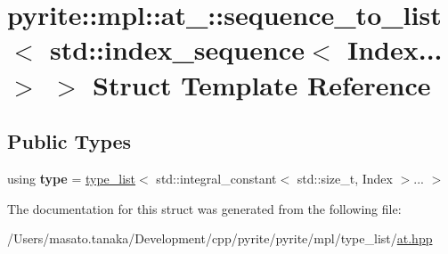 \hypertarget{structpyrite_1_1mpl_1_1at___1_1sequence__to__list_3_01std_1_1index__sequence_3_01_index_8_8_8_01_4_01_4}{}\section{pyrite\+:\+:mpl\+:\+:at\+\_\+\+:\+:sequence\+\_\+to\+\_\+list$<$ std\+:\+:index\+\_\+sequence$<$ Index... $>$ $>$ Struct Template Reference}
\label{structpyrite_1_1mpl_1_1at___1_1sequence__to__list_3_01std_1_1index__sequence_3_01_index_8_8_8_01_4_01_4}
\subsection*{Public Types}
\begin{DoxyCompactItemize}
\item 
\mbox{\label{structpyrite_1_1mpl_1_1at___1_1sequence__to__list_3_01std_1_1index__sequence_3_01_index_8_8_8_01_4_01_4_a9560b86188e9174b37f30bee12db4576}} 
using {\bfseries type} = \mbox{\hyperlink{structpyrite_1_1core_1_1mpl_1_1type__list}{type\+\_\+list}}$<$ std\+::integral\+\_\+constant$<$ std\+::size\+\_\+t, Index $>$... $>$
\end{DoxyCompactItemize}


The documentation for this struct was generated from the following file\+:\begin{DoxyCompactItemize}
\item 
/\+Users/masato.\+tanaka/\+Development/cpp/pyrite/pyrite/mpl/type\+\_\+list/\mbox{\hyperlink{at_8hpp}{at.\+hpp}}\end{DoxyCompactItemize}
